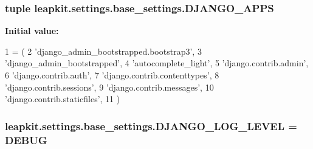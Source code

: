 \hypertarget{namespaceleapkit_1_1settings_1_1base__settings_a288074ff9c19d256b4ff07e29312cd03}{
\subsubsection[{D\-J\-A\-N\-G\-O\-\_\-\-A\-P\-P\-S}]{\setlength{\rightskip}{0pt plus 5cm}tuple leapkit.\-settings.\-base\-\_\-settings.\-D\-J\-A\-N\-G\-O\-\_\-\-A\-P\-P\-S}}\label{namespaceleapkit_1_1settings_1_1base__settings_a288074ff9c19d256b4ff07e29312cd03}
{\bfseries Initial value\-:}
\begin{DoxyCode}
1 = (
2     \textcolor{stringliteral}{'django\_admin\_bootstrapped.bootstrap3'},
3     \textcolor{stringliteral}{'django\_admin\_bootstrapped'},
4     \textcolor{stringliteral}{'autocomplete\_light'},
5     \textcolor{stringliteral}{'django.contrib.admin'},
6     \textcolor{stringliteral}{'django.contrib.auth'},
7     \textcolor{stringliteral}{'django.contrib.contenttypes'},
8     \textcolor{stringliteral}{'django.contrib.sessions'},
9     \textcolor{stringliteral}{'django.contrib.messages'},
10     \textcolor{stringliteral}{'django.contrib.staticfiles'},
11 )
\end{DoxyCode}
\hypertarget{namespaceleapkit_1_1settings_1_1base__settings_aa84dc9d6a4399648a2a241c7fefd1584}{
\subsubsection[{D\-J\-A\-N\-G\-O\-\_\-\-L\-O\-G\-\_\-\-L\-E\-V\-E\-L}]{\setlength{\rightskip}{0pt plus 5cm}leapkit.\-settings.\-base\-\_\-settings.\-D\-J\-A\-N\-G\-O\-\_\-\-L\-O\-G\-\_\-\-L\-E\-V\-E\-L = {\bf D\-E\-B\-U\-G}}}\label{namespaceleapkit_1_1settings_1_1base__settings_aa84dc9d6a4399648a2a241c7fefd1584}
